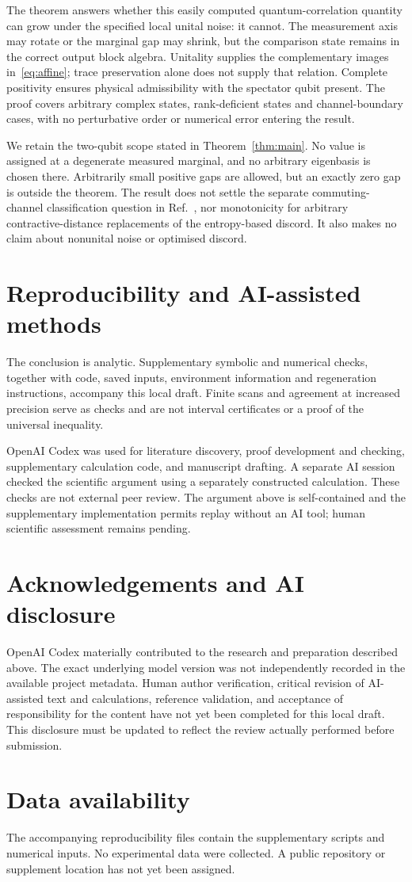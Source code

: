 \documentclass[12pt]{article}
\begin{document}
The theorem answers whether this easily computed quantum-correlation quantity can grow under the specified local unital noise: it cannot. The measurement axis may rotate or the marginal gap may shrink, but the comparison state remains in the correct output block algebra. Unitality supplies the complementary images in~\eqref{eq:affine}; trace preservation alone does not supply that relation. Complete positivity ensures physical admissibility with the spectator qubit present. The proof covers arbitrary complex states, rank-deficient states and channel-boundary cases, with no perturbative order or numerical error entering the result.

We retain the two-qubit scope stated in Theorem~\ref{thm:main}. No value is assigned at a degenerate measured marginal, and no arbitrary eigenbasis is chosen there. Arbitrarily small positive gaps are allowed, but an exactly zero gap is outside the theorem. The result does not settle the separate commuting-channel classification question in Ref.~\cite{Liu2019}, nor monotonicity for arbitrary contractive-distance replacements of the entropy-based discord. It also makes no claim about nonunital noise or optimised discord.

\section*{Reproducibility and AI-assisted methods}
The conclusion is analytic. Supplementary symbolic and numerical checks, together with code, saved inputs, environment information and regeneration instructions, accompany this local draft. Finite scans and agreement at increased precision serve as checks and are not interval certificates or a proof of the universal inequality.

OpenAI Codex was used for literature discovery, proof development and checking, supplementary calculation code, and manuscript drafting. A separate AI session checked the scientific argument using a separately constructed calculation. These checks are not external peer review. The argument above is self-contained and the supplementary implementation permits replay without an AI tool; human scientific assessment remains pending.

\section*{Acknowledgements and AI disclosure}
OpenAI Codex materially contributed to the research and preparation described above. The exact underlying model version was not independently recorded in the available project metadata. Human author verification, critical revision of AI-assisted text and calculations, reference validation, and acceptance of responsibility for the content have not yet been completed for this local draft. This disclosure must be updated to reflect the review actually performed before submission.

\section*{Data availability}
The accompanying reproducibility files contain the supplementary scripts and numerical inputs. No experimental data were collected. A public repository or supplement location has not yet been assigned.



\end{document}
